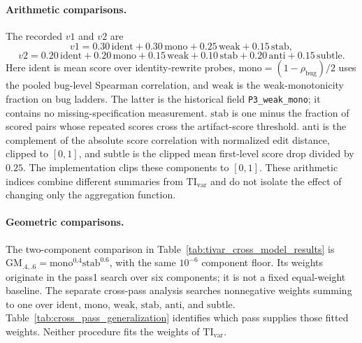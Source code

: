 \paragraph{Arithmetic comparisons.}
The recorded $v1$ and $v2$ are
\[
 v1=0.30\,\mathrm{ident}+0.30\,\mathrm{mono}+0.25\,\mathrm{weak}+0.15\,\mathrm{stab},
\]
\[
 v2=0.20\,\mathrm{ident}+0.20\,\mathrm{mono}+0.15\,\mathrm{weak}+0.10\,\mathrm{stab}+0.20\,\mathrm{anti}+0.15\,\mathrm{subtle}.
\]
Here $\mathrm{ident}$ is mean score over identity-rewrite probes, $\mathrm{mono}=(1-\rho_{\mathrm{bug}})/2$ uses the pooled bug-level Spearman correlation, and $\mathrm{weak}$ is the weak-monotonicity fraction on bug ladders.
The latter is the historical field \texttt{P3\_weak\_mono}; it contains no missing-specification measurement.
$\mathrm{stab}$ is one minus the fraction of scored pairs whose repeated scores cross the artifact-score threshold.
$\mathrm{anti}$ is the complement of the absolute score correlation with normalized edit distance, clipped to $[0,1]$, and $\mathrm{subtle}$ is the clipped mean first-level score drop divided by $0.25$.
The implementation clips these components to $[0,1]$.
These arithmetic indices combine different summaries from $\mathrm{TI}_{\mathrm{var}}$ and do not isolate the effect of changing only the aggregation function.

\paragraph{Geometric comparisons.}
The two-component comparison in Table~\ref{tab:tivar_cross_model_results} is $\mathrm{GM}_{.4,.6}=\mathrm{mono}^{0.4}\mathrm{stab}^{0.6}$, with the same $10^{-6}$ component floor.
Its weights originate in the pass1 search over six components; it is not a fixed equal-weight baseline.
The separate cross-pass analysis searches nonnegative weights summing to one over $\mathrm{ident}$, $\mathrm{mono}$, $\mathrm{weak}$, $\mathrm{stab}$, $\mathrm{anti}$, and $\mathrm{subtle}$.
Table~\ref{tab:cross_pass_generalization} identifies which pass supplies those fitted weights.
Neither procedure fits the weights of $\mathrm{TI}_{\mathrm{var}}$.
